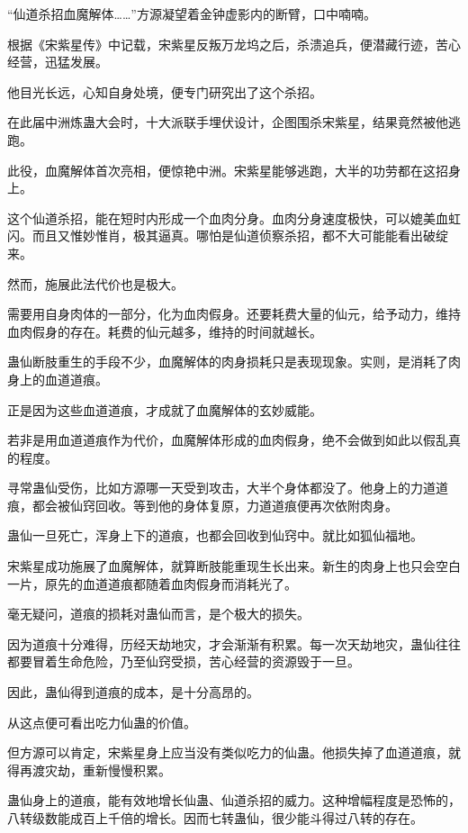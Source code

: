 
\begin{this_body}

“仙道杀招血魔解体……”方源凝望着金钟虚影内的断臂，口中喃喃。

根据《宋紫星传》中记载，宋紫星反叛万龙坞之后，杀溃追兵，便潜藏行迹，苦心经营，迅猛发展。

他目光长远，心知自身处境，便专门研究出了这个杀招。

在此届中洲炼蛊大会时，十大派联手埋伏设计，企图围杀宋紫星，结果竟然被他逃跑。

此役，血魔解体首次亮相，便惊艳中洲。宋紫星能够逃跑，大半的功劳都在这招身上。

这个仙道杀招，能在短时内形成一个血肉分身。血肉分身速度极快，可以媲美血虹闪。而且又惟妙惟肖，极其逼真。哪怕是仙道侦察杀招，都不大可能能看出破绽来。

然而，施展此法代价也是极大。

需要用自身肉体的一部分，化为血肉假身。还要耗费大量的仙元，给予动力，维持血肉假身的存在。耗费的仙元越多，维持的时间就越长。

蛊仙断肢重生的手段不少，血魔解体的肉身损耗只是表现现象。实则，是消耗了肉身上的血道道痕。

正是因为这些血道道痕，才成就了血魔解体的玄妙威能。

若非是用血道道痕作为代价，血魔解体形成的血肉假身，绝不会做到如此以假乱真的程度。

寻常蛊仙受伤，比如方源哪一天受到攻击，大半个身体都没了。他身上的力道道痕，都会被仙窍回收。等到他的身体复原，力道道痕便再次依附肉身。

蛊仙一旦死亡，浑身上下的道痕，也都会回收到仙窍中。就比如狐仙福地。

宋紫星成功施展了血魔解体，就算断肢能重现生长出来。新生的肉身上也只会空白一片，原先的血道道痕都随着血肉假身而消耗光了。

毫无疑问，道痕的损耗对蛊仙而言，是个极大的损失。

因为道痕十分难得，历经天劫地灾，才会渐渐有积累。每一次天劫地灾，蛊仙往往都要冒着生命危险，乃至仙窍受损，苦心经营的资源毁于一旦。

因此，蛊仙得到道痕的成本，是十分高昂的。

从这点便可看出吃力仙蛊的价值。

但方源可以肯定，宋紫星身上应当没有类似吃力的仙蛊。他损失掉了血道道痕，就得再渡灾劫，重新慢慢积累。

蛊仙身上的道痕，能有效地增长仙蛊、仙道杀招的威力。这种增幅程度是恐怖的，八转级数能成百上千倍的增长。因而七转蛊仙，很少能斗得过八转的存在。


\end{this_body}
